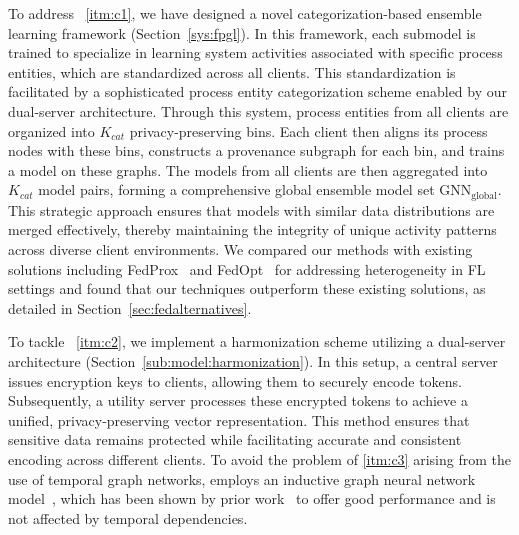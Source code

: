 


To address ~\ref{itm:c1}, we have designed a novel categorization-based \gnnshort ensemble learning framework (Section~\ref{sys:fpgl}). In this framework, each submodel is trained to specialize in learning system activities associated with specific process entities, which are standardized across all clients. This standardization is facilitated by a sophisticated process entity categorization scheme enabled by our dual-server architecture. Through this system, process entities from all clients are organized into  \( K_{cat} \) privacy-preserving bins. Each client then aligns its process nodes with these bins, constructs a provenance subgraph for each bin, and trains a \gnnshort model on these graphs. The models from all clients are then aggregated into  \( K_{cat} \) model pairs, forming a comprehensive global ensemble model set \( \text{GNN}_{\text{global}} \). This strategic approach ensures that models with similar data distributions are merged effectively, thereby maintaining the integrity of unique activity patterns across diverse client environments. We compared our methods with existing solutions including FedProx~\cite{li2020federated} and FedOpt~\cite{asad2020fedopt} for addressing heterogeneity in FL settings and found that our techniques outperform these existing solutions, as detailed in Section~\ref{sec:fedalternatives}.



To tackle ~\ref{itm:c2}, we implement a \wordvec harmonization scheme utilizing a dual-server architecture (Section~\ref{sub:model:harmonization}). In this setup, a central server issues encryption keys to clients, allowing them to securely encode \wordvec tokens. Subsequently, a utility server processes these encrypted tokens to achieve a unified, privacy-preserving vector representation. This method ensures that sensitive data remains protected while facilitating accurate and consistent \wordvec encoding across different clients. To avoid the problem of \ref{itm:c3} arising from the use of temporal graph networks, \Sys employs an inductive graph neural network model~\cite{hamilton2017inductive}, which has been shown by prior work~\cite{flash2024,shadewatcher,wang2022threatrace} to offer good performance and is not affected by temporal dependencies. 


